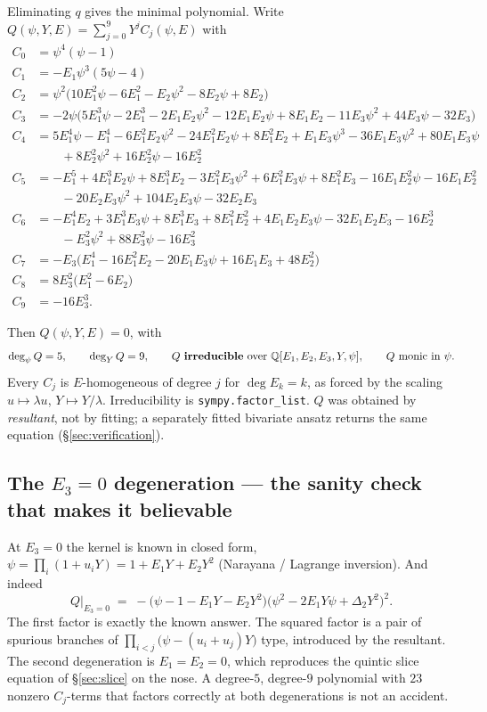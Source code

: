 \documentclass[11pt,a4paper]{article}
\newcommand{\Q}{\mathbb{Q}}
\theoremstyle{plain}
\theoremstyle{definition}
\begin{document}
Eliminating $q$ gives the minimal polynomial. Write $Q(\psi,Y,E)=\sum_{j=0}^{9}Y^jC_j(\psi,E)$
with
{\small
\begin{align*}
C_0 &= \psi^4(\psi-1)\\
C_1 &= -E_1\psi^3(5\psi-4)\\
C_2 &= \psi^2\bigl(10E_1^2\psi-6E_1^2-E_2\psi^2-8E_2\psi+8E_2\bigr)\\
C_3 &= -2\psi\bigl(5E_1^3\psi-2E_1^3-2E_1E_2\psi^2-12E_1E_2\psi+8E_1E_2
      -11E_3\psi^2+44E_3\psi-32E_3\bigr)\\
C_4 &= 5E_1^4\psi-E_1^4-6E_1^2E_2\psi^2-24E_1^2E_2\psi+8E_1^2E_2
      +E_1E_3\psi^3-36E_1E_3\psi^2+80E_1E_3\psi\\
    &\qquad +8E_2^2\psi^2+16E_2^2\psi-16E_2^2\\
C_5 &= -E_1^5+4E_1^3E_2\psi+8E_1^3E_2-3E_1^2E_3\psi^2+6E_1^2E_3\psi+8E_1^2E_3
      -16E_1E_2^2\psi-16E_1E_2^2\\
    &\qquad -20E_2E_3\psi^2+104E_2E_3\psi-32E_2E_3\\
C_6 &= -E_1^4E_2+3E_1^3E_3\psi+8E_1^3E_3+8E_1^2E_2^2+4E_1E_2E_3\psi-32E_1E_2E_3
      -16E_2^3\\
    &\qquad -E_3^2\psi^2+88E_3^2\psi-16E_3^2\\
C_7 &= -E_3\bigl(E_1^4-16E_1^2E_2-20E_1E_3\psi+16E_1E_3+48E_2^2\bigr)\\
C_8 &= 8E_3^2\bigl(E_1^2-6E_2\bigr)\\
C_9 &= -16E_3^3 .
\end{align*}}

\noindent Then $Q(\psi,Y,E)=0$, with
\[
\deg_\psi Q=5,\qquad \deg_Y Q=9,\qquad Q \text{ \textbf{irreducible} over }
\Q[E_1,E_2,E_3,Y,\psi],\qquad Q \text{ monic in }\psi .
\]
Every $C_j$ is $E$-homogeneous of degree $j$ for $\deg E_k=k$, as forced by the scaling
$u\mapsto\lambda u$, $Y\mapsto Y/\lambda$. Irreducibility is \texttt{sympy.factor\_list}.
$Q$ was obtained by \emph{resultant}, not by fitting; a separately fitted bivariate ansatz
returns the same equation (\S\ref{sec:verification}).

\subsection*{The $E_3=0$ degeneration --- the sanity check that makes it believable}

At $E_3=0$ the kernel is known in closed form, $\psi=\prod_i(1+u_iY)=1+E_1Y+E_2Y^2$
(Narayana / Lagrange inversion). And indeed
\[
Q\Big|_{E_3=0}\;=\;-\bigl(\psi-1-E_1Y-E_2Y^2\bigr)\bigl(\psi^2-2E_1Y\psi+\Delta_2Y^2\bigr)^2 .
\]
The first factor is exactly the known answer. The squared factor is a pair of spurious
branches of $\prod_{i<j}\bigl(\psi-(u_i+u_j)Y\bigr)$ type, introduced by the resultant.
The second degeneration is $E_1=E_2=0$, which reproduces the quintic slice equation of
\S\ref{sec:slice} on the nose. A degree-$5$, degree-$9$ polynomial with $23$ nonzero
$C_j$-terms that factors correctly at both degenerations is not an accident.
\end{document}
